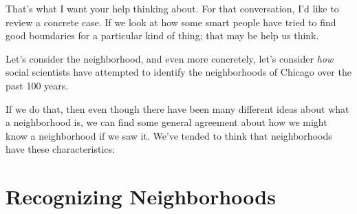 That's what I want your help thinking about. For that conversation,
I'd like to review a concrete case. If we look at how some smart
people have tried to find good boundaries for a particular kind of
thing; that may be help us think.

Let's consider the neighborhood, and even more concretely, let's
consider \emph{how} social scientists have attempted to identify the
neighborhoods of Chicago over the past 100 years. 

If we do that, then even though there have been many different ideas
about what a neighborhood is, we can find some general agreement about
how we might know a neighborhood if we saw it. We've tended to think
that neighborhoods have these characteristics:

\section{Recognizing Neighborhoods}

